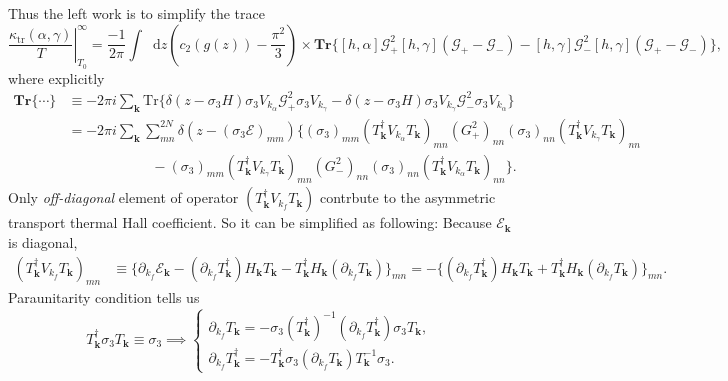 \documentclass[10pt,nofootinbib]{revtex4}
\newcommand*\dd{\mathop{}\!\mathrm{d}}
\begin{document}
		Thus the left work is to simplify the trace
		\begin{equation}\label{1.6.3}
			\left.\dfrac{\kappa_{\text{tr}}(\alpha,\gamma)}{T}\right|_{T_0}^\infty=\dfrac{-1}{2\pi}\int\dd z\left(c_2(g(z))-\dfrac{\pi^2}{3}\right)\times\mathbf{Tr}\bigg\{[h,\alpha]\mathcal{G}_+^2[h,\gamma](\mathcal{G}_+ - \mathcal{G}_-)-[h,\gamma]\mathcal{G}_-^2[h,\gamma](\mathcal{G}_+ - \mathcal{G}_-)\bigg\},
		\end{equation}
		where explicitly
		\begin{align}\label{1.6.4}
			\mathbf{Tr}\{\cdots\}&\equiv-2\pi i\sum_{\bm{k}}\mathrm{Tr}\bigg\{\delta(z-\sigma_3 H)\sigma_3 V_{k_\alpha}\mathcal{G}_+^2\sigma_3 V_{k_\gamma}-\delta(z-\sigma_3 H)\sigma_3 V_{k_\gamma}\mathcal{G}_-^2\sigma_3 V_{k_\alpha}\bigg\}\nonumber\\
			&=-2\pi i\sum_{\bm{k}}\sum_{mn}^{2N}\delta(z-(\sigma_3\mathscr{E})_{mm})\bigg\{(\sigma_3)_{mm}(T^\dagger_{\bm{k}}V_{k_\alpha}T_{\bm{k}})_{mn}(G_+^2)_{nn}(\sigma_3)_{nn}(T_{\bm{k}}^\dagger V_{k_\gamma}T_{\bm{k}})_{nn}\nonumber\\
			&\qquad\qquad\qquad-(\sigma_3)_{mm}(T^\dagger_{\bm{k}}V_{k_\gamma}T_{\bm{k}})_{mn}(G_-^2)_{nn}(\sigma_3)_{nn}(T_{\bm{k}}^\dagger V_{k_\alpha}T_{\bm{k}})_{nn}\bigg\}.
		\end{align}
		Only \emph{off-diagonal} element of operator $(T_{\bm{k}}^\dagger V_{k_f}T_{\bm{k}})$ contrbute to the asymmetric transport thermal Hall coefficient. So it can be simplified as following: Because $\mathscr{E}_{\bm{k}}$ is diagonal,
		\begin{align*}
			(T_{\bm{k}}^\dagger V_{k_f}T_{\bm{k}})_{mn}&\equiv\bigg\{\partial_{k_f}\mathscr{E}_{\bm{k}}-(\partial_{k_f}T_{\bm{k}}^\dagger)H_{\bm{k}}T_{\bm{k}}-T_{\bm{k}}^\dagger H_{\bm{k}}(\partial_{k_f}T_{\bm{k}})\bigg\}_{mn}=-\bigg\{(\partial_{k_f}T_{\bm{k}}^\dagger)H_{\bm{k}}T_{\bm{k}}+T_{\bm{k}}^\dagger H_{\bm{k}}(\partial_{k_f}T_{\bm{k}})\bigg\}_{mn}.
		\end{align*}
		Paraunitarity condition tells us
		\begin{equation*}
			T_{\bm{k}}^\dagger\sigma_3 T_{\bm{k}}\equiv\sigma_3\implies \begin{cases}
				\partial_{k_f}T_{\bm{k}}=-\sigma_3(T_{\bm{k}}^\dagger)^{-1}(\partial_{k_f}T_{\bm{k}}^\dagger)\sigma_3 T_{\bm{k}},\\
				\partial_{k_f}T_{\bm{k}}^\dagger=-T_{\bm{k}}^\dagger\sigma_3(\partial_{k_f}T_{\bm{k}})T_{\bm{k}}^{-1}\sigma_3.
			\end{cases}
		\end{equation*}
\end{document}
